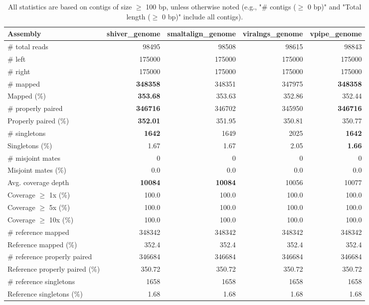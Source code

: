 \documentclass[12pt,a4paper]{article}
\begin{document}
\begin{table}[ht]
\begin{center}
\caption{All statistics are based on contigs of size $\geq$ 100 bp, unless otherwise noted (e.g., "\# contigs ($\geq$ 0 bp)" and "Total length ($\geq$ 0 bp)" include all contigs).}
\begin{tabular}{|l*{4}{|r}|}
\hline
Assembly & shiver\_genome & smaltalign\_genome & viralngs\_genome & vpipe\_genome \\ \hline
\# total reads & 98495 & 98508 & 98615 & 98843 \\ \hline
\# left & 175000 & 175000 & 175000 & 175000 \\ \hline
\# right & 175000 & 175000 & 175000 & 175000 \\ \hline
\# mapped & {\bf 348358} & 348351 & 347975 & {\bf 348358} \\ \hline
Mapped (\%) & {\bf 353.68} & 353.63 & 352.86 & 352.44 \\ \hline
\# properly paired & {\bf 346716} & 346702 & 345950 & {\bf 346716} \\ \hline
Properly paired (\%) & {\bf 352.01} & 351.95 & 350.81 & 350.77 \\ \hline
\# singletons & {\bf 1642} & 1649 & 2025 & {\bf 1642} \\ \hline
Singletons (\%) & 1.67 & 1.67 & 2.05 & {\bf 1.66} \\ \hline
\# misjoint mates & 0 & 0 & 0 & 0 \\ \hline
Misjoint mates (\%) & 0.0 & 0.0 & 0.0 & 0.0 \\ \hline
Avg. coverage depth & {\bf 10084} & {\bf 10084} & 10056 & 10077 \\ \hline
Coverage $\geq$ 1x (\%) & 100.0 & 100.0 & 100.0 & 100.0 \\ \hline
Coverage $\geq$ 5x (\%) & 100.0 & 100.0 & 100.0 & 100.0 \\ \hline
Coverage $\geq$ 10x (\%) & 100.0 & 100.0 & 100.0 & 100.0 \\ \hline
\# reference mapped & 348342 & 348342 & 348342 & 348342 \\ \hline
Reference mapped (\%) & 352.4 & 352.4 & 352.4 & 352.4 \\ \hline
\# reference properly paired & 346684 & 346684 & 346684 & 346684 \\ \hline
Reference properly paired (\%) & 350.72 & 350.72 & 350.72 & 350.72 \\ \hline
\# reference singletons & 1658 & 1658 & 1658 & 1658 \\ \hline
Reference singletons (\%) & 1.68 & 1.68 & 1.68 & 1.68 \\ \hline

\end{tabular}
\end{center}
\end{table}
\end{document}
